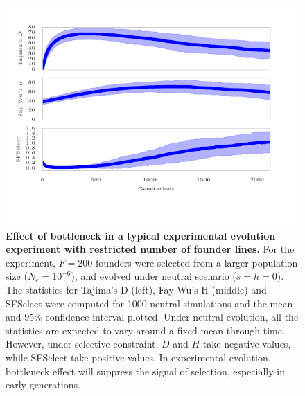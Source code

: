 \documentclass[11pt]{article}
\begin{document}
\begin{figure}[H]
	\centering 
	\includegraphics[trim=3.2in 0.1in 3.2in 0.2in , 
	clip,width=\textwidth]{figures/bottleneck}
	\caption{{\bf Effect of bottleneck in a typical experimental
            evolution experiment with restricted number of founder
            lines.} For the experiment, $F=200$ founders were selected
          from a larger population size ($N_e=10^{-6}$), and evolved
          under neutral scenario ($s=h=0$). The statistics for
          Tajima's D (left), Fay Wu's H (middle) and SFSelect were
          computed for 1000 neutral simulations and the mean and 95\%
          confidence interval plotted. Under neutral evolution, all
          the statistics are expected to vary around a fixed mean
          through time. However, under selective constraint, $D$ and
          $H$ take negative values, while SFSelect take positive
          values. In experimental evolution, bottleneck effect will
          suppress the signal of selection, especially in early
          generations. }
	\label{fig:bottleneck}
\end{figure}
\end{document}

